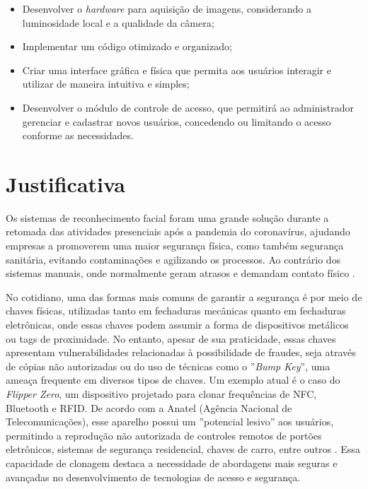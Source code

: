 \begin{itemize}
    \item  Desenvolver o \textit{hardware} para aquisição de imagens, considerando a 
    luminosidade local e a qualidade da câmera;
  
    \item Implementar um código otimizado e organizado; 
    
    \item Criar uma interface gráfica e física que permita aos usuários interagir 
    e utilizar de maneira intuitiva e simples;
    
    \item Desenvolver o módulo de controle de acesso, que permitirá 
    ao administrador gerenciar e cadastrar novos usuários, concedendo ou 
    limitando o acesso conforme as necessidades.
\end{itemize}

\section{Justificativa}\label{sec:justificativa}

Os sistemas de reconhecimento facial foram uma grande solução durante a retomada 
das atividades presenciais após a pandemia do coronavírus, ajudando empresas
a promoverem uma maior segurança física, como também segurança sanitária, 
evitando contaminações e agilizando os processos. Ao contrário dos sistemas 
manuais, onde normalmente geram atrasos e demandam contato físico \cite{terra2020}.

No cotidiano, uma das formas mais comuns de garantir a segurança é por meio de 
chaves físicas, utilizadas tanto em fechaduras mecânicas quanto em fechaduras 
eletrônicas, onde essas chaves podem assumir a forma de dispositivos metálicos 
ou tags de proximidade. No entanto, apesar de sua praticidade, 
essas chaves apresentam vulnerabilidades relacionadas à possibilidade de 
fraudes, seja através de cópias não autorizadas ou do uso de técnicas como 
o ''\textit{Bump Key}'', uma ameaça frequente em diversos tipos de chaves. Um exemplo 
atual é o caso do \textit{Flipper Zero}, um dispositivo projetado para clonar 
frequências de NFC, Bluetooth e RFID. De acordo com a Anatel (Agência 
Nacional de Telecomunicações), esse aparelho possui um ''potencial lesivo'' 
aos usuários, permitindo a reprodução não autorizada de controles 
remotos de portões eletrônicos, sistemas de segurança residencial, 
chaves de carro, entre outros \cite{anatel2023}. Essa capacidade de clonagem destaca 
a necessidade de abordagens mais seguras e avançadas no desenvolvimento 
de tecnologias de acesso e segurança. 

